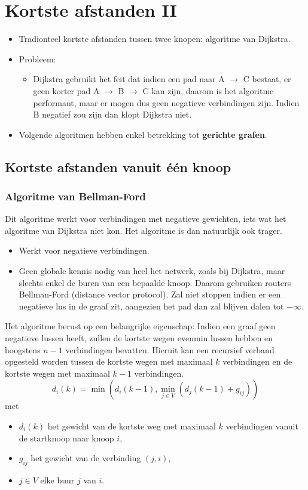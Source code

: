 \chapter{Kortste afstanden II}
\begin{itemize}
	\item Tradionteel kortste afstanden tussen twee knopen: algoritme van Dijkstra.
	\item Probleem:
	\begin{itemize}
		\item Dijkstra gebruikt het feit dat indien een pad naar A $\rightarrow$ C bestaat, er geen korter pad A $\rightarrow$ B $\rightarrow$ C kan zijn, daarom is het algoritme performant, maar er mogen dus geen negatieve verbindingen zijn. Indien B negatief zou zijn dan klopt Dijkstra niet.
	\end{itemize}
	\item Volgende algoritmen hebben enkel betrekking tot \textbf{gerichte grafen}.

\end{itemize}
\section{Kortste afstanden vanuit één knoop}
\subsection{Algoritme van Bellman-Ford}
Dit algoritme werkt voor verbindingen met negatieve gewichten, iets wat het algoritme van Dijkstra niet kon. Het algoritme is dan natuurlijk ook trager.

\begin{itemize}
	\item  Werkt voor negatieve verbindingen.
	\item  Geen globale kennis nodig van heel het netwerk, zoals bij Dijkstra, maar slechts enkel de buren van een bepaalde knoop. Daarom gebruiken routers Bellman-Ford (distance vector protocol).
	\alert  Zal niet stoppen indien er een negatieve lus in de graaf zit, aangezien het pad dan zal blijven dalen tot $-\infty$. 
\end{itemize}

Het algoritme berust op een belangrijke eigenschap: Indien een graaf geen negatieve lussen heeft, zullen de kortste wegen evenmin lussen hebben en hoogstens $n - 1$ verbindingen bevatten. Hieruit kan een recursief verband opgesteld worden tussen de kortste wegen met maximaal $k$ verbindingen en de kortste wegen met maximaal $k - 1$ verbindingen.
$$d_i(k) = \min(d_i(k - 1), \min\limits_{j \in V} (d_j(k - 1) + g_{ij}))$$
met
\begin{itemize}
	\item $d_i(k)$ het gewicht van de kortste weg met maximaal $k$ verbindingen vanuit de startknoop naar knoop $i$,
	\item $g_{ij}$ het gewicht van de verbinding $(j, i)$,
	\item $j \in V$ elke buur $j$ van $i$.
\end{itemize}




